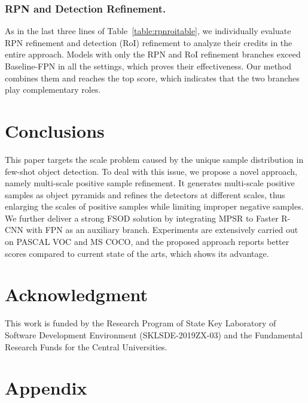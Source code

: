 \documentclass[runningheads]{llncs}
\begin{document}
\subsubsection{RPN and Detection Refinement.}
As in the last three lines of Table~\ref{table:rpnroitable}, we individually evaluate RPN refinement and detection (RoI) refinement to analyze their credits in the entire approach.
Models with only the RPN and RoI refinement branches exceed Baseline-FPN in all the settings, which proves their effectiveness. 
Our method combines them and reaches the top score, which indicates that the two branches play complementary roles.

\section{Conclusions}

This paper targets the scale problem caused by the unique sample distribution in few-shot object detection. To deal with this issue, we propose a novel approach, namely multi-scale positive sample refinement. It generates multi-scale positive samples as object pyramids and refines the detectors at different scales, thus enlarging the scales of positive samples while limiting improper negative samples. We further deliver a strong FSOD solution by integrating MPSR to Faster R-CNN with FPN as an auxiliary branch. Experiments are extensively carried out on PASCAL VOC and MS COCO, and the proposed approach reports better scores compared to current state of the arts, which shows its advantage.

\section*{Acknowledgment}

This work is funded by the Research Program of State Key Laboratory of Software Development Environment (SKLSDE-2019ZX-03) and the Fundamental Research Funds for the Central Universities.

\clearpage


\clearpage
\appendix
\section{Appendix}
\end{document}
